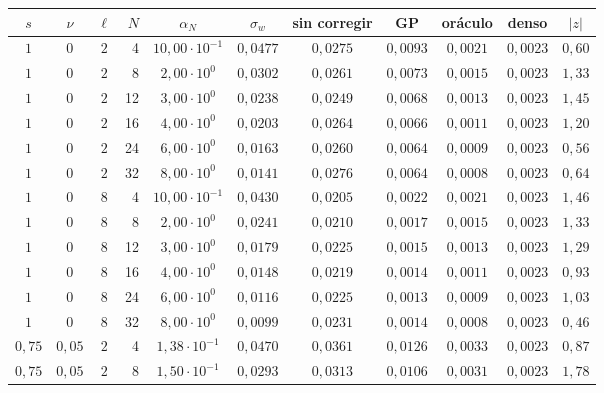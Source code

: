 \begin{tabular}{cccrccccccc}
\toprule
$s$ & $\nu$ & $\ell$ & $N$ & $\alpha_N$ & $\sigma_w$ & sin corregir & GP & oráculo & denso & $|z|$ \\
\midrule
$1$ & $0$ & $2$ & 4 & $10{,}00 \cdot 10^{-1}$ & $0{,}0477$ & $0{,}0275$ & $0{,}0093$ & $0{,}0021$ & $0{,}0023$ & $0{,}60$ \\
$1$ & $0$ & $2$ & 8 & $2{,}00 \cdot 10^{0}$ & $0{,}0302$ & $0{,}0261$ & $0{,}0073$ & $0{,}0015$ & $0{,}0023$ & $1{,}33$ \\
$1$ & $0$ & $2$ & 12 & $3{,}00 \cdot 10^{0}$ & $0{,}0238$ & $0{,}0249$ & $0{,}0068$ & $0{,}0013$ & $0{,}0023$ & $1{,}45$ \\
$1$ & $0$ & $2$ & 16 & $4{,}00 \cdot 10^{0}$ & $0{,}0203$ & $0{,}0264$ & $0{,}0066$ & $0{,}0011$ & $0{,}0023$ & $1{,}20$ \\
$1$ & $0$ & $2$ & 24 & $6{,}00 \cdot 10^{0}$ & $0{,}0163$ & $0{,}0260$ & $0{,}0064$ & $0{,}0009$ & $0{,}0023$ & $0{,}56$ \\
$1$ & $0$ & $2$ & 32 & $8{,}00 \cdot 10^{0}$ & $0{,}0141$ & $0{,}0276$ & $0{,}0064$ & $0{,}0008$ & $0{,}0023$ & $0{,}64$ \\
\midrule
$1$ & $0$ & $8$ & 4 & $10{,}00 \cdot 10^{-1}$ & $0{,}0430$ & $0{,}0205$ & $0{,}0022$ & $0{,}0021$ & $0{,}0023$ & $1{,}46$ \\
$1$ & $0$ & $8$ & 8 & $2{,}00 \cdot 10^{0}$ & $0{,}0241$ & $0{,}0210$ & $0{,}0017$ & $0{,}0015$ & $0{,}0023$ & $1{,}33$ \\
$1$ & $0$ & $8$ & 12 & $3{,}00 \cdot 10^{0}$ & $0{,}0179$ & $0{,}0225$ & $0{,}0015$ & $0{,}0013$ & $0{,}0023$ & $1{,}29$ \\
$1$ & $0$ & $8$ & 16 & $4{,}00 \cdot 10^{0}$ & $0{,}0148$ & $0{,}0219$ & $0{,}0014$ & $0{,}0011$ & $0{,}0023$ & $0{,}93$ \\
$1$ & $0$ & $8$ & 24 & $6{,}00 \cdot 10^{0}$ & $0{,}0116$ & $0{,}0225$ & $0{,}0013$ & $0{,}0009$ & $0{,}0023$ & $1{,}03$ \\
$1$ & $0$ & $8$ & 32 & $8{,}00 \cdot 10^{0}$ & $0{,}0099$ & $0{,}0231$ & $0{,}0014$ & $0{,}0008$ & $0{,}0023$ & $0{,}46$ \\
\midrule
$0{,}75$ & $0{,}05$ & $2$ & 4 & $1{,}38 \cdot 10^{-1}$ & $0{,}0470$ & $0{,}0361$ & $0{,}0126$ & $0{,}0033$ & $0{,}0023$ & $0{,}87$ \\
$0{,}75$ & $0{,}05$ & $2$ & 8 & $1{,}50 \cdot 10^{-1}$ & $0{,}0293$ & $0{,}0313$ & $0{,}0106$ & $0{,}0031$ & $0{,}0023$ & $1{,}78$ \\

\end{tabular}
